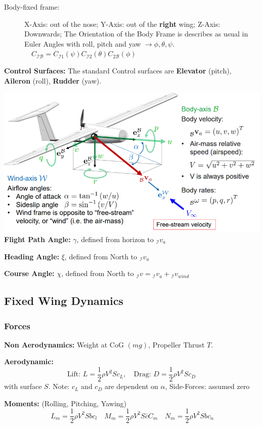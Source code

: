 \documentclass[fontsize=6pt,DIV=calc,a4paper,ngerman]{scrartcl}
\begin{document}
\begin{multicols*}{4}
\begin{description}
		\item[Body-fixed frame:]X-Axis: out of the nose;
		      Y-Axis: out of the \textbf{right} wing;
		      Z-Axis: Downwards; The Orientation of the Body Frame is describes as usual in Euler Angles with roll, pitch and yaw $\rightarrow \phi, \theta,\psi$.
		      $\quad C_\mathcal{IB} = C_{\mathcal{I}1}(\psi)C_{\mathcal{I}2}(\theta)C_{2\mathcal{B}}(\phi)$
	\end{description}

	\textbf{Control Surfaces:} The standard Control surfaces are \textbf{Elevator} (pitch), \textbf{Aileron} (roll), \textbf{Rudder} (yaw).

	\includegraphics[width=0.8\linewidth]{Fixedwing_kin.png}\\

	\textbf{Flight Path Angle:} $\gamma$, defined from horizon to ${}_\mathcal{I}v_a$

	\textbf{Heading Angle:} $\xi$, defined from North to ${}_\mathcal{I}v_a$

	\textbf{Course Angle:} $\chi$, defined from North to ${}_\mathcal{I}v = {}_\mathcal{I}v_a + {}_\mathcal{I}v_{wind}$

	\subsection{Fixed Wing Dynamics}
	\subsubsection{Forces}

	\textbf{Non Aerodynamics:} Weight at CoG $(mg)$, Propeller Thrust $T$.

	\textbf{Aerodynamic:}
	$$\text{Lift: }L=\frac{1}{2}\rho V^2Sc_L, \quad \text{Drag: } D=\frac{1}{2}\rho V^2Sc_D $$ with surface $S$.
	Note: $c_L$ and $c_D$ are dependent on $\alpha$, Side-Forces: assumed zero

	\textbf{Moments:} (Rolling, Pitching, Yawing)
	$$\ L_m = \frac{1}{2} \rho V^2 S b c_l  \quad M_m = \frac{1}{2} \rho V^2 S \bar{c} C_m \quad  N_m = \frac{1}{2} \rho V^2 S b c_n$$


\end{multicols*}
\end{document}
